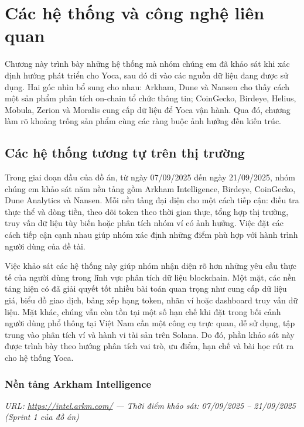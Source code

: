 \chapter{Các hệ thống và công nghệ liên quan}
\label{Chapter2}

Chương này trình bày những hệ thống mà nhóm chúng em đã khảo sát khi xác định hướng phát triển cho Yoca, sau đó đi vào các nguồn dữ liệu đang được sử dụng. Hai góc nhìn bổ sung cho nhau: Arkham, Dune và Nansen cho thấy cách một sản phẩm phân tích on-chain tổ chức thông tin; CoinGecko, Birdeye, Helius, Mobula, Zerion và Moralis cung cấp dữ liệu để Yoca vận hành. Qua đó, chương làm rõ khoảng trống sản phẩm cùng các ràng buộc ảnh hưởng đến kiến trúc.


\section{Các hệ thống tương tự trên thị trường}
\label{sec:cac_he_thong_tuong_tu}

Trong giai đoạn đầu của đồ án, từ ngày 07/09/2025 đến ngày 21/09/2025, nhóm chúng em khảo sát năm nền tảng gồm Arkham Intelligence, Birdeye, CoinGecko, Dune Analytics và Nansen. Mỗi nền tảng đại diện cho một cách tiếp cận: điều tra thực thể và dòng tiền, theo dõi token theo thời gian thực, tổng hợp thị trường, truy vấn dữ liệu tùy biến hoặc phân tích nhóm ví có ảnh hưởng. Việc đặt các cách tiếp cận cạnh nhau giúp nhóm xác định những điểm phù hợp với hành trình người dùng của đề tài.

Việc khảo sát các hệ thống này giúp nhóm nhận diện rõ hơn những yêu cầu thực tế của người dùng trong lĩnh vực phân tích dữ liệu blockchain. Một mặt, các nền tảng hiện có đã giải quyết tốt nhiều bài toán quan trọng như cung cấp dữ liệu giá, biểu đồ giao dịch, bảng xếp hạng token, nhãn ví hoặc dashboard truy vấn dữ liệu. Mặt khác, chúng vẫn còn tồn tại một số hạn chế khi đặt trong bối cảnh người dùng phổ thông tại Việt Nam cần một công cụ trực quan, dễ sử dụng, tập trung vào phân tích ví và hành vi tài sản trên Solana. Do đó, phần khảo sát này được trình bày theo hướng phân tích vai trò, ưu điểm, hạn chế và bài học rút ra cho hệ thống Yoca.

\subsection{Nền tảng Arkham Intelligence}

\noindent\textit{\small URL: \url{https://intel.arkm.com/} \quad--- \quad Thời điểm khảo sát: 07/09/2025 -- 21/09/2025 (Sprint 1 của đồ án)}
\vspace{1mm}

